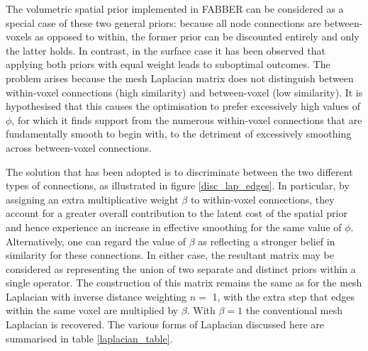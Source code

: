 The volumetric spatial prior implemented in FABBER can be considered as a special case of these two general priors: because all node connections are between-voxels as opposed to within, the former prior can be discounted entirely and only the latter holds. In contrast, in the surface case it has been observed that applying both priors with equal weight leads to suboptimal outcomes. The problem arises because the mesh Laplacian matrix does not distinguish between within-voxel connections (high similarity) and between-voxel (low similarity). It is hypothesised that this causes the optimisation to prefer excessively high values of $\phi$, for which it finds support from the numerous within-voxel connections that are fundamentally smooth to begin with, to the detriment of excessively smoothing across between-voxel connections. 

The solution that has been adopted is to discriminate between the two different types of connections, as illustrated in figure \ref{disc_lap_edges}. In particular, by assigning an extra multiplicative weight $\beta$ to within-voxel connections, they account for a greater overall contribution to the latent cost of the spatial prior and hence experience an increase in effective smoothing for the same value of $\phi$. Alternatively, one can regard the value of $\beta$ as reflecting a stronger belief in similarity for these connections. In either case, the resultant matrix may be considered as representing the union of two separate and distinct priors within a single operator. The construction of this matrix remains the same as for the mesh Laplacian with inverse distance weighting $n =$ 1, with the extra step that edges within the same voxel are multiplied by $\beta$. With $\beta = 1$ the conventional mesh Laplacian is recovered. The various forms of Laplacian discussed here are summarised in table \ref{laplacian_table}. 

